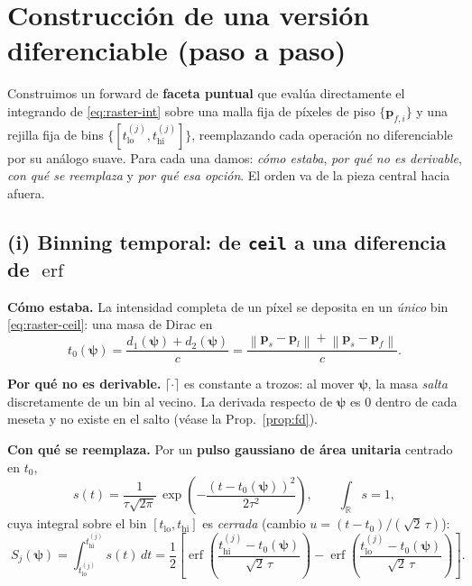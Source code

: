 \documentclass[11pt,a4paper]{article}
\theoremstyle{plain}
\theoremstyle{definition}
\newcommand{\vect}[1]{\boldsymbol{#1}}
\newcommand{\R}{\mathbb{R}}
\newcommand{\erf}{\operatorname{erf}}
\newcommand{\norm}[1]{\left\lVert #1 \right\rVert}
\begin{document}
\section{Construcci\'on de una versi\'on diferenciable (paso a paso)}
\label{sec:construccion}

Construimos un forward de \textbf{faceta puntual} que eval\'ua directamente el
integrando de \eqref{eq:raster-int} sobre una malla fija de p\'ixeles de piso
$\{\vect{p}_{f,i}\}$ y una rejilla fija de bins
$\{[t^{(j)}_{\mathrm{lo}},t^{(j)}_{\mathrm{hi}}]\}$, reemplazando cada operaci\'on
no diferenciable por su an\'alogo suave. Para cada una damos: \emph{c\'omo
estaba}, \emph{por qu\'e no es derivable}, \emph{con qu\'e se reemplaza} y
\emph{por qu\'e esa opci\'on}. El orden va de la pieza central hacia afuera.

\subsection{(i) Binning temporal: de \texttt{ceil} a una diferencia de \texorpdfstring{$\erf$}{erf}}
\label{sec:erf}

\textbf{C\'omo estaba.} La intensidad completa de un p\'ixel se deposita en un
\emph{\'unico} bin \eqref{eq:raster-ceil}: una masa de Dirac en
\begin{equation}
    t_0(\vect{\psi})=\frac{d_1(\vect\psi)+d_2(\vect\psi)}{c}
    =\frac{\norm{\vect{p}_s-\vect{p}_l}+\norm{\vect{p}_s-\vect{p}_f}}{c}.
    \label{eq:tof}
\end{equation}

\textbf{Por qu\'e no es derivable.} $\lceil\cdot\rceil$ es constante a trozos:
al mover $\vect{\psi}$, la masa \emph{salta} discretamente de un bin al vecino.
La derivada respecto de $\vect{\psi}$ es $0$ dentro de cada meseta y no existe en
el salto (v\'ease la Prop.~\ref{prop:fd}).

\textbf{Con qu\'e se reemplaza.} Por un \textbf{pulso gaussiano de \'area
unitaria} centrado en $t_0$,
\begin{equation}
    s(t)=\frac{1}{\tau\sqrt{2\pi}}\,
    \exp\!\left(-\frac{(t-t_0(\vect{\psi}))^2}{2\tau^2}\right),
    \qquad
    \int_{\R} s = 1,
    \label{eq:pulse}
\end{equation}
cuya integral sobre el bin $[t_{\mathrm{lo}},t_{\mathrm{hi}}]$ es \emph{cerrada}
(cambio $u=(t-t_0)/(\sqrt2\,\tau)$):
\begin{equation}
    \boxed{\;
    S_j(\vect{\psi})
    =\int_{t^{(j)}_{\mathrm{lo}}}^{t^{(j)}_{\mathrm{hi}}} s(t)\,dt
    =\frac{1}{2}
    \left[
        \erf\!\left(\frac{t^{(j)}_{\mathrm{hi}}-t_0(\vect{\psi})}{\sqrt2\,\tau}\right)
        -\erf\!\left(\frac{t^{(j)}_{\mathrm{lo}}-t_0(\vect{\psi})}{\sqrt2\,\tau}\right)
    \right].
    \;}
    \label{eq:erf-bin}
\end{equation}
\end{document}

